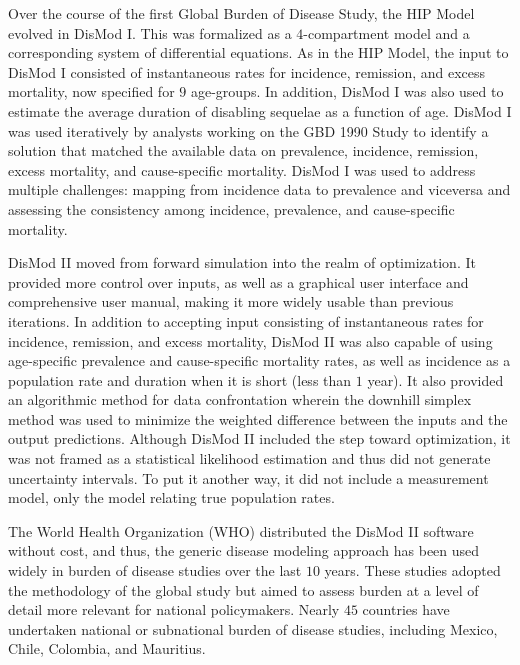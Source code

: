 Over the course of the first Global Burden of Disease Study, the HIP
Model evolved in DisMod
I.\cite{murray_global_1996}
This was formalized as a $4$-compartment model and a corresponding
system of differential equations.  As in the HIP Model, the input to
DisMod I consisted of instantaneous rates for incidence, remission,
and excess mortality, now specified for $9$ age-groups.  In addition,
DisMod I was also used to
estimate the average duration of disabling sequelae as a function of
age.  DisMod I was used iteratively by analysts working on the GBD 1990
Study to identify a solution that matched the available data on
prevalence, incidence, remission, excess mortality, and cause-specific
mortality.  DisMod I was used to address multiple challenges: mapping
from incidence data to prevalence and viceversa and assessing the
consistency among incidence, prevalence, and cause-specific mortality.

DisMod II moved from forward simulation into the realm of
optimization.  It provided more control over inputs, as well as a 
graphical user interface and comprehensive user manual, making it more
widely usable than previous iterations.\cite{Barendregt_Generic_2003}
In addition to accepting input consisting of instantaneous rates for incidence,
remission, and excess mortality, DisMod II was also capable of using
age-specific prevalence and cause-specific mortality rates, as well as
incidence as a population rate and duration when it is short (less
than $1$ year).  It also provided an algorithmic method for data
confrontation wherein the downhill simplex method was used to
minimize the weighted difference between the inputs and the output
predictions.  Although DisMod II included the step toward
optimization, it was not framed as a statistical likelihood estimation
and thus did not generate uncertainty intervals.  To put it another
way, it did not include a measurement model, only the model relating
true population rates.

The World Health Organization (WHO) distributed the DisMod II software 
without cost, and thus, the generic disease modeling approach
has been used widely in burden of disease studies over the last $10$
years. These studies adopted the methodology of the global study but
aimed to assess burden at a level of detail more relevant for national
policymakers. Nearly $45$ countries have undertaken national or
subnational burden of disease studies, including Mexico,
Chile, Colombia, and
Mauritius.\cite{Lozano_Burden_1995,republica_de_colombia_ministerio_de_salud_carga_1994,concha_barrientos_carga_1996,Vos_Mauritius_1996}

